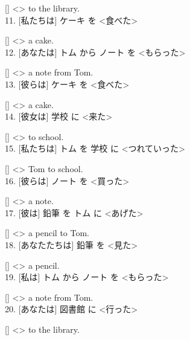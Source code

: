 \documentclass[uplatex,
paper=a4,
fontsize=18pt,
jafontsize=16pt,
number_of_lines=30,
line_length=30zh,
baselineskip=25pt,
]{jlreq}
\begin{document}
  [\hspace{3em}] <\hspace{3em}> to the library.
\\

11.  [私たちは] ケーキ を <食べた>

  [\hspace{3em}] <\hspace{3em}> a cake.
\\

12.  [あなたは] トム から ノート を <もらった>

  [\hspace{3em}] <\hspace{3em}> a note from Tom.
\\

13.  [彼らは] ケーキ を <食べた>

  [\hspace{3em}] <\hspace{3em}> a cake.
\\

14.  [彼女は] 学校 に <来た>

  [\hspace{3em}] <\hspace{3em}> to school.
\\

15.  [私たちは] トム を 学校 に <つれていった>

  [\hspace{3em}] <\hspace{3em}> Tom to school.
\\

16.  [彼らは] ノート を <買った>

  [\hspace{3em}] <\hspace{3em}> a note.
\\

17.  [彼は] 鉛筆 を トム に <あげた>

  [\hspace{3em}] <\hspace{3em}> a pencil to Tom.
\\

18.  [あなたたちは] 鉛筆 を <見た>

  [\hspace{3em}] <\hspace{3em}> a pencil.
\\

19.  [私は] トム から ノート を <もらった>

  [\hspace{3em}] <\hspace{3em}> a note from Tom.
\\

20.  [あなたは] 図書館 に <行った>

  [\hspace{3em}] <\hspace{3em}> to the library.
\\
\end{document}
